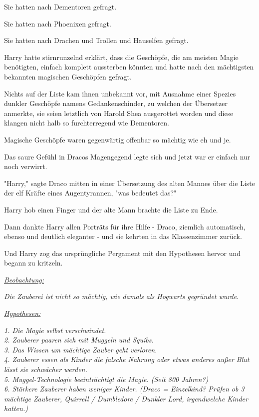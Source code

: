 {Sie hatten nach Dementoren gefragt.

Sie hatten nach Phoenixen gefragt.

Sie hatten nach Drachen und Trollen und Hauselfen gefragt.

Harry hatte stirnrunzelnd erklärt, dass die Geschöpfe, die am meisten Magie benötigten, einfach komplett aussterben könnten und hatte nach den mächtigsten bekannten magischen Geschöpfen gefragt.

Nichts auf der Liste kam ihnen unbekannt vor, mit Ausnahme einer Spezies dunkler Geschöpfe namens Gedankenschinder, zu welchen der Übersetzer anmerkte, sie seien letztlich von Harold Shea ausgerottet worden und diese klangen nicht halb so furchterregend wie Dementoren.

Magische Geschöpfe waren gegenwärtig offenbar so mächtig wie eh und je.

Das saure Gefühl in Dracos Magengegend legte sich und jetzt war er einfach nur noch verwirrt.

"Harry," sagte Draco mitten in einer Übersetzung des alten Mannes über die Liste der elf Kräfte eines Augentyrannen, "was bedeutet das?"

Harry hob einen Finger und der alte Mann brachte die Liste zu Ende.

Dann dankte Harry allen Porträts für ihre Hilfe - Draco, ziemlich automatisch, ebenso und deutlich eleganter - und sie kehrten in das Klassenzimmer zurück.

Und Harry zog das ursprüngliche Pergament mit den Hypothesen hervor und begann zu kritzeln.

\emph{\uline{Beobachtung:}}

\emph{Die Zauberei ist nicht so mächtig, wie damals als Hogwarts gegründet wurde.}

\emph{\uline{Hypothesen:}}

\emph{\emph{{1. Die Magie selbst verschwindet.\\ 2. Zauberer paaren sich mit Muggeln und Squibs.\\ 3. Das Wissen um mächtige Zauber geht verloren.\\ 4. Zauberer essen als Kinder die falsche Nahrung oder etwas anderes außer Blut lässt sie schwächer werden.\\ 5. Muggel-Technologie beeinträchtigt die Magie. (Seit 800 Jahren?)\\ 6. Stärkere Zauberer haben weniger Kinder. (Draco = Einzelkind? Prüfen ob 3 mächtige Zauberer, Quirrell / Dumbledore / Dunkler Lord, }}\emph{irgendwelche Kinder hatten.)}}

}
